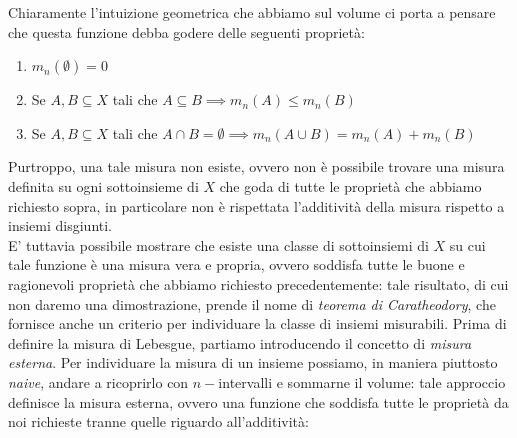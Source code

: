 Chiaramente l'intuizione geometrica che abbiamo sul volume ci porta a pensare che questa funzione debba godere delle seguenti proprietà:
%
\begin{enumerate}[label=\protect\circled{\arabic*}]
	\item $m_n(\emptyset) = 0$
	\item Se $A, B \subseteq X$ tali che $A \subseteq B \implies m_n(A) \leq m_n(B)$
	\item Se $A, B \subseteq X$ tali che $A \cap B = \emptyset \implies m_n(A \cup B) = m_n(A) + m_n(B)$
\end{enumerate}
%
Purtroppo, una tale misura non esiste, ovvero non è possibile trovare una misura definita su ogni sottoinsieme di $X$ che goda di tutte le proprietà che abbiamo richiesto sopra, in particolare non è rispettata l'additività della misura rispetto a insiemi disgiunti. \\
E' tuttavia possibile mostrare che esiste una classe di sottoinsiemi di $X$ su cui tale funzione è una misura vera e propria, ovvero soddisfa tutte le buone e ragionevoli proprietà che abbiamo richiesto precedentemente: tale risultato, di cui non daremo una dimostrazione, prende il nome di \emph{teorema di Caratheodory}, che fornisce anche un criterio per individuare la classe di insiemi misurabili. 
%
Prima di definire la misura di Lebesgue, partiamo introducendo il concetto di \emph{misura esterna}. Per individuare la misura di un insieme possiamo, in maniera piuttosto \emph{naive}, andare a ricoprirlo con $n-$intervalli e sommarne il volume: tale approccio definisce la misura esterna, ovvero una funzione che soddisfa tutte le proprietà da noi richieste tranne quelle riguardo all'additività:
